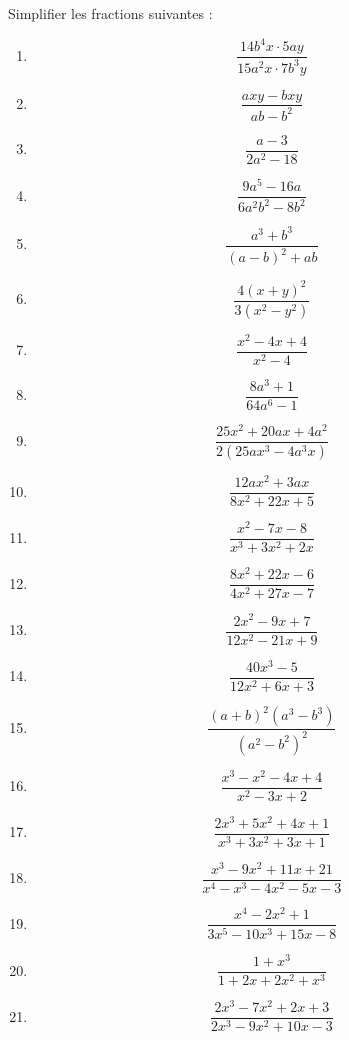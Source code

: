 \begin{exercice}
Simplifier les fractions suivantes : 
\begin{multicols}{2}
\begin{enumerate}
\item $$\frac{14{{b}^{4}}x\cdot 5ay}{15{{a}^{2}}x\cdot 7{{b}^{3}}y}$$
\item $$\frac{axy-bxy}{ab-{{b}^{2}}}$$
\item $$\frac{a-3}{2{{a}^{2}}-18}$$
\item $$\frac{9{{a}^{5}}-16a}{6{{a}^{2}}{{b}^{2}}-8{{b}^{2}}}$$
\item $$\frac{{{a}^{3}}+{{b}^{3}}}{{{(a-b)}^{2}}+ab}$$
\item $$\frac{4{{(x+y)}^{2}}}{3({{x}^{2}}-{{y}^{2}})}$$
\item $$\frac{{{x}^{2}}-4x+4}{{{x}^{2}}-4}$$
\item $$\frac{8{{a}^{3}}+1}{64{{a}^{6}}-1}$$
\item $$\frac{25{{x}^{2}}+20ax+4{{a}^{2}}}{2(25a{{x}^{3}}-4{{a}^{3}}x)}$$
\item $$\frac{12a{{x}^{2}}+3ax}{8{{x}^{2}}+22x+5}$$
\item $$\frac{{{x}^{2}}-7x-8}{{{x}^{3}}+3{{x}^{2}}+2x}$$
\item $$\frac{8{{x}^{2}}+22x-6}{4{{x}^{2}}+27x-7}$$
\item $$\frac{2{{x}^{2}}-9x+7}{12{{x}^{2}}-21x+9}$$
\item $$\frac{40{{x}^{3}}-5}{12{{x}^{2}}+6x+3}$$
\item $$\frac{{{(a+b)}^{2}}({{a}^{3}}-{{b}^{3}})}{{{({{a}^{2}}-{{b}^{2}})}^{2}}}$$
\item $$\frac{{{x}^{3}}-{{x}^{2}}-4x+4}{{{x}^{2}}-3x+2}$$
\item $$\frac{2{{x}^{3}}+5{{x}^{2}}+4x+1}{{{x}^{3}}+3{{x}^{2}}+3x+1}$$
\item $$\frac{{{x}^{3}}-9{{x}^{2}}+11x+21}{{{x}^{4}}-{{x}^{3}}-4{{x}^{2}}-5x-3}$$
\item $$\frac{{{x}^{4}}-2{{x}^{2}}+1}{3{{x}^{5}}-10{{x}^{3}}+15x-8}$$
\item $$\frac{1+{{x}^{3}}}{1+2x+2{{x}^{2}}+{{x}^{3}}}$$
\item $$\frac{2{{x}^{3}}-7{{x}^{2}}+2x+3}{2{{x}^{3}}-9{{x}^{2}}+10x-3}$$
\end{enumerate}
\end{multicols}
\end{exercice}

